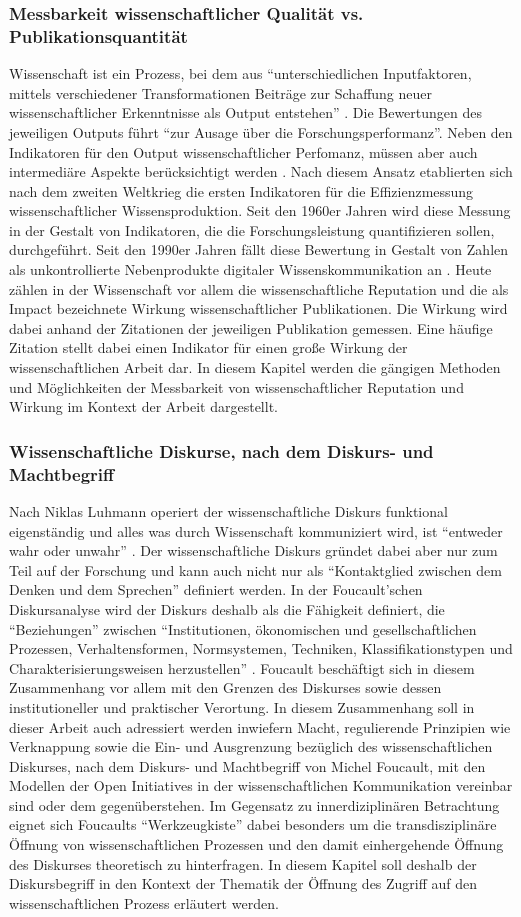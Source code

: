 \subsubsection{Messbarkeit wissenschaftlicher Qualität vs. Publikationsquantität}
Wissenschaft ist ein Prozess, bei dem aus “unterschiedlichen Inputfaktoren, mittels verschiedener Transformationen Beiträge zur Schaffung neuer wissenschaftlicher Erkenntnisse als Output entstehen” . Die Bewertungen des jeweiligen Outputs führt “zur Ausage über die Forschungsperformanz”. Neben den Indikatoren für den Output wissenschaftlicher Perfomanz, müssen aber auch intermediäre Aspekte berücksichtigt werden . Nach diesem Ansatz etablierten sich nach dem zweiten Weltkrieg die ersten Indikatoren für die Effizienzmessung wissenschaftlicher Wissensproduktion. Seit den 1960er Jahren wird diese Messung in der Gestalt von Indikatoren, die die Forschungsleistung quantifizieren sollen, durchgeführt. Seit den 1990er Jahren fällt diese Bewertung in Gestalt von Zahlen als unkontrollierte Nebenprodukte digitaler Wissenskommunikation an . Heute zählen in der Wissenschaft vor allem die wissenschaftliche Reputation und die als Impact bezeichnete Wirkung wissenschaftlicher Publikationen.  Die Wirkung wird dabei anhand der Zitationen der jeweiligen Publikation gemessen. Eine häufige Zitation stellt dabei einen Indikator für einen große Wirkung der wissenschaftlichen Arbeit dar. In diesem Kapitel werden die gängigen Methoden und Möglichkeiten der Messbarkeit von wissenschaftlicher Reputation und Wirkung im Kontext der Arbeit dargestellt.
\subsubsection{Wissenschaftliche Diskurse, nach dem Diskurs- und Machtbegriff}
Nach Niklas Luhmann operiert der wissenschaftliche Diskurs funktional eigenständig und alles was durch Wissenschaft kommuniziert wird, ist “entweder wahr oder unwahr” . Der wissenschaftliche Diskurs gründet dabei aber nur zum Teil auf der Forschung und kann auch nicht nur als  “Kontaktglied zwischen dem Denken und dem Sprechen”  definiert werden. In der Foucault'schen Diskursanalyse wird der Diskurs deshalb als die Fähigkeit definiert, die “Beziehungen” zwischen “Institutionen, ökonomischen und gesellschaftlichen Prozessen, Verhaltensformen, Normsystemen, Techniken, Klassifikationstypen und Charakterisierungsweisen herzustellen” . Foucault beschäftigt sich in diesem Zusammenhang vor allem mit den Grenzen des Diskurses sowie dessen institutioneller und praktischer Verortung. In diesem Zusammenhang soll in dieser Arbeit auch adressiert werden inwiefern Macht, regulierende Prinzipien wie Verknappung sowie die Ein- und Ausgrenzung bezüglich des wissenschaftlichen Diskurses, nach dem Diskurs- und Machtbegriff von Michel Foucault, mit den Modellen der Open Initiatives in der wissenschaftlichen Kommunikation vereinbar sind oder dem gegenüberstehen. Im Gegensatz zu innerdiziplinären Betrachtung eignet sich Foucaults “Werkzeugkiste”  dabei besonders um die transdisziplinäre Öffnung von wissenschaftlichen Prozessen und den damit einhergehende Öffnung des Diskurses theoretisch zu hinterfragen. 
In diesem Kapitel soll deshalb der Diskursbegriff in den Kontext der Thematik der Öffnung des Zugriff auf den wissenschaftlichen Prozess erläutert werden.
